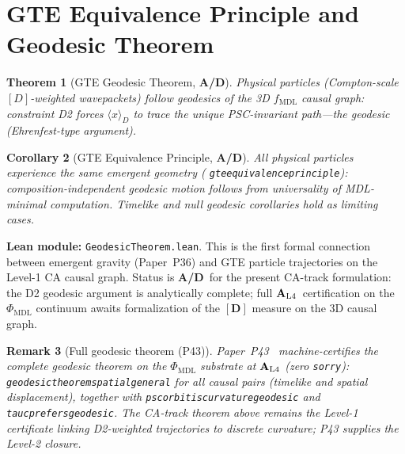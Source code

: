\documentclass[12pt,letterpaper]{article}
\newtheorem{theorem}{Theorem}[section]
\newtheorem{corollary}[theorem]{Corollary}
\newtheorem{remark}[theorem]{Remark}
\newcommand{\fmdl}{f_{\mathrm{MDL}}}
\newcommand{\Dclass}{[D]}
\newcommand{\catAL}{\ensuremath{\textbf{A}_{\rm L4}}}
\newcommand{\catAD}{\textbf{A/D}}
\newcommand{\lean}[1]{%
  \penalty-100
  \begingroup\def\_{\textunderscore\allowbreak}\texttt{#1}\endgroup}
\begin{document}
\section{GTE Equivalence Principle and Geodesic Theorem}
\label{sec:geodesic}

\begin{theorem}[GTE Geodesic Theorem, \catAD]
\label{thm:geodesic}
Physical particles (Compton-scale $\Dclass$-weighted wavepackets) follow
geodesics of the 3D $\fmdl$ causal graph: constraint D2 forces
$\langle x \rangle_D$ to trace the unique PSC-invariant path---the geodesic
(Ehrenfest-type argument).
\end{theorem}

\begin{corollary}[GTE Equivalence Principle, \catAD]
\label{cor:equivalence}
All physical particles experience the same emergent geometry
(\lean{gte\_equivalence\_principle}): composition-independent geodesic motion
follows from universality of MDL-minimal computation.
Timelike and null geodesic corollaries hold as limiting cases.
\end{corollary}

\noindent\textbf{Lean module:} \lean{GeodesicTheorem.lean}.
This is the first formal connection between emergent gravity (Paper~P36) and
GTE particle trajectories on the Level-1 CA causal graph.
Status is \catAD\ for the present CA-track formulation: the D2 geodesic argument
is analytically complete; full \catAL\ certification on the $\Phi_{\mathrm{MDL}}$
continuum awaits formalization of the $[\mathbf{D}]$ measure on the 3D causal graph.

\begin{remark}[Full geodesic theorem (P43)]
\label{rem:geodesic-p43}
Paper~P43~\cite{SpivackCompleteness} machine-certifies the complete geodesic
theorem on the $\Phi_{\mathrm{MDL}}$ substrate at \catAL{} (zero \texttt{sorry}):
\lean{geodesic\_theorem\_spatial\_general} for all causal pairs (timelike and
spatial displacement), together with \lean{psc\_orbit\_is\_curvature\_geodesic} and
\lean{tau\_c\_prefers\_geodesic}.  The CA-track theorem above remains the
Level-1 certificate linking D2-weighted trajectories to discrete curvature;
P43 supplies the Level-2 closure.
\end{remark}
\end{document}
